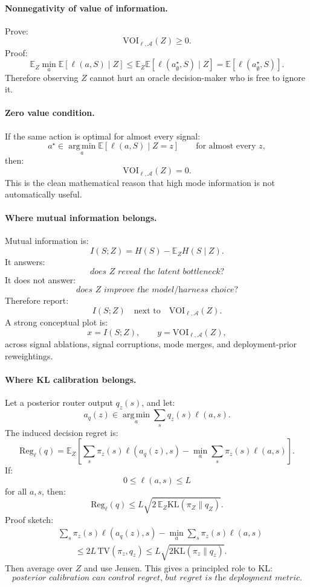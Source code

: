 \documentclass{article}
\providecommand{\KL}{\mathrm{KL}}
\providecommand{\argmin}{\operatorname*{arg\,min}}
\begin{document}
\paragraph{Nonnegativity of value of information.}
Prove:
\[
    \mathrm{VOI}_{\ell,\mathcal A}(Z)\ge 0.
\]
Proof:
\[
    \mathbb E_Z \min_a \mathbb E[\ell(a,S)\mid Z]
    \le
    \mathbb E_Z \mathbb E[\ell(a^\star_{\emptyset},S)\mid Z]
    =
    \mathbb E[\ell(a^\star_{\emptyset},S)].
\]
Therefore observing \(Z\) cannot hurt an oracle decision-maker who is free to ignore it.

\paragraph{Zero value condition.}
If the same action is optimal for almost every signal:
\[
    a^\star
    \in
    \argmin_a \mathbb E[\ell(a,S)\mid Z=z]
    \qquad
    \text{for almost every }z,
\]
then:
\[
    \mathrm{VOI}_{\ell,\mathcal A}(Z)=0.
\]
This is the clean mathematical reason that high mode information is not automatically useful.

\paragraph{Where mutual information belongs.}
Mutual information is:
\[
    I(S;Z)
    =
    H(S)-\mathbb E_ZH(S\mid Z).
\]
It answers:
\[
    \textit{does \(Z\) reveal the latent bottleneck?}
\]
It does not answer:
\[
    \textit{does \(Z\) improve the model/harness choice?}
\]
Therefore report:
\[
    I(S;Z)
    \quad\text{next to}\quad
    \mathrm{VOI}_{\ell,\mathcal A}(Z).
\]
A strong conceptual plot is:
\[
    x=I(S;Z),
    \qquad
    y=\mathrm{VOI}_{\ell,\mathcal A}(Z),
\]
across signal ablations, signal corruptions, mode merges, and deployment-prior reweightings.

\paragraph{Where KL calibration belongs.}
Let a posterior router output \(q_z(s)\), and let:
\[
    a_q(z)
    \in
    \argmin_a \sum_s q_z(s)\ell(a,s).
\]
The induced decision regret is:
\[
    \mathrm{Reg}_{\ell}(q)
    =
    \mathbb E_Z
    \left[
    \sum_s \pi_z(s)\ell(a_q(z),s)
    -
    \min_a \sum_s \pi_z(s)\ell(a,s)
    \right].
\]
If:
\[
    0\le \ell(a,s)\le L
\]
for all \(a,s\), then:
\[
    \mathrm{Reg}_{\ell}(q)
    \le
    L\sqrt{2\,\mathbb E_Z\KL(\pi_Z\|q_Z)}.
\]
Proof sketch:
\[
\begin{aligned}
    &\sum_s \pi_z(s)\ell(a_q(z),s)
    -
    \min_a \sum_s\pi_z(s)\ell(a,s)\\
    &\qquad\le
    2L\,\mathrm{TV}(\pi_z,q_z)
    \le
    L\sqrt{2\KL(\pi_z\|q_z)}.
\end{aligned}
\]
Then average over \(Z\) and use Jensen.
This gives a principled role to KL:
\[
    \textit{posterior calibration can control regret, but regret is the deployment metric.}
\]
\end{document}
